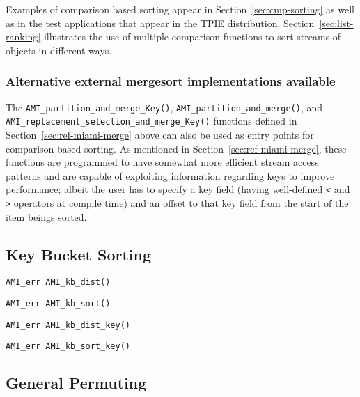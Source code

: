 Examples of comparison based sorting appear in
Section~\ref{sec:cmp-sorting} as well as in the test applications that 
appear in the TPIE distribution.  Section~\ref{sec:list-ranking}
illustrates the use of multiple comparison functions to sort streams
of objects in different ways.


\subsubsection{Alternative external mergesort implementations available}

The \verb|AMI_partition_and_merge_Key()|,
\verb|AMI_partition_and_merge()|, and\\
\verb|AMI_replacement_selection_and_merge_Key()| 
functions defined in Section~\ref{sec:ref-miami-merge} above 
can also be used as entry points for comparison based 
sorting. As mentioned in Section~\ref{sec:ref-miami-merge},
these functions are programmed to have somewhat more efficient
stream access patterns and are capable of exploiting information
regarding keys to improve performance; albeit the user has 
to specify a key field (having well-defined \verb|<| and \verb|>|
operators at compile time) and an offset to that key field from
the start of the item beings sorted.


\subsection{Key Bucket Sorting}
\label{sec:ref-ami-kb-sort}


\begin{verbatim}
AMI_err AMI_kb_dist()
\end{verbatim}

\begin{verbatim}
AMI_err AMI_kb_sort()
\end{verbatim}

\begin{verbatim}
AMI_err AMI_kb_dist_key()
\end{verbatim}

\begin{verbatim}
AMI_err AMI_kb_sort_key()
\end{verbatim}

\subsection{General Permuting}
\label{sec:ref-ami-gp}

